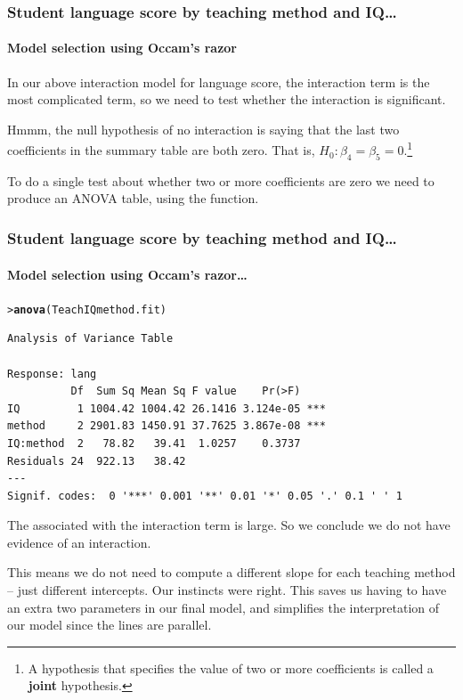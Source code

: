 \documentclass{beamer}\usepackage[]{graphicx}\usepackage[]{xcolor}
\makeatletter
\newcommand{\hlstd}[1]{\textcolor[rgb]{0.345,0.345,0.345}{#1}}%
\newcommand{\hlkwd}[1]{\textcolor[rgb]{0.737,0.353,0.396}{\textbf{#1}}}%
\newenvironment{kframe}{%
 \def\at@end@of@kframe{}%
 \ifinner\ifhmode%
  \def\at@end@of@kframe{\end{minipage}}%
  \begin{minipage}{\columnwidth}%
 \fi\fi%
 \def\FrameCommand##1{\hskip\@totalleftmargin \hskip-\fboxsep
 \colorbox{shadecolor}{##1}\hskip-\fboxsep
     \hskip-\linewidth \hskip-\@totalleftmargin \hskip\columnwidth}%
 \MakeFramed {\advance\hsize-\width
   \@totalleftmargin\z@ \linewidth\hsize
   \@setminipage}}%
 {\par\unskip\endMakeFramed%
 \at@end@of@kframe}
\newenvironment{knitrout}{}{} %
\makeatother
\begin{document}
\begin{frame}[fragile]
\frametitle{Student language score by teaching method and IQ\ldots}
\framesubtitle{Model selection using Occam's razor}
In our above interaction model for language score, the interaction term is the most complicated term, so we need to test whether the interaction is significant.
\bigskip

Hmmm, the null hypothesis of no interaction is saying that the last two coefficients in the summary table are both zero. That is, $H_0: \beta_4=\beta_5=0$.\footnote{A hypothesis that specifies the value of two or more coefficients is called a {\bf joint} hypothesis.}\\
\bigskip

To do a single test about whether two or more coefficients are zero we need to produce an ANOVA table, using the  function.
\vfill
\end{frame}


\begin{frame}[fragile]
\frametitle{Student language score by  teaching method and IQ\ldots}
\framesubtitle{Model selection using Occam's razor\ldots}
\begin{knitrout}\scriptsize
{}\color{fgcolor}\begin{kframe}
\begin{alltt}
\hlstd{> }\hlkwd{anova}\hlstd{(TeachIQmethod.fit)}
\end{alltt}
\begin{verbatim}
Analysis of Variance Table

Response: lang
          Df  Sum Sq Mean Sq F value    Pr(>F)    
IQ         1 1004.42 1004.42 26.1416 3.124e-05 ***
method     2 2901.83 1450.91 37.7625 3.867e-08 ***
IQ:method  2   78.82   39.41  1.0257    0.3737    
Residuals 24  922.13   38.42                      
---
Signif. codes:  0 '***' 0.001 '**' 0.01 '*' 0.05 '.' 0.1 ' ' 1
\end{verbatim}
\end{kframe}
\end{knitrout}
The \pval{} associated with the interaction term  is large. 
So we conclude we do not have evidence of an interaction.
\medskip

This means we do not need to compute a different slope for each teaching method -- just different intercepts. Our instincts were right. 
This saves us having to have an extra two parameters in our final model, and simplifies the interpretation of our model since the lines are parallel.

\end{frame}
\end{document}
